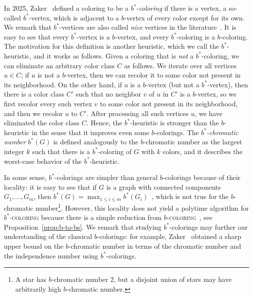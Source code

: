 \documentclass[runningheads, envcountsame]{llncs}
\newcommand{\bscoloring}{$b^*$-\textsc{coloring}\xspace}
\newcommand{\bcoloring}{$b$-\textsc{coloring}\xspace}
\begin{document}
In 2025, Zaker~\cite{ZAKER2025370} defined a coloring to be a $b^*$-\emph{coloring} if there is a vertex, a so-called $b^*$-vertex, which is adjacent to a $b$-vertex of every color except for its own.
We remark that $b^*$-vertices are also called \emph{nice} vertices in the literature~\cite{ZAKER2025370}.
It is easy to see that every $b^*$-vertex is a $b$-vertex, and every $b^*$-coloring is a $b$-coloring.
The motivation for this definition is another heuristic, which we call the $b^*$-heuristic, and it works as follows. Given a coloring that is \emph{not} a $b^*$-coloring, we can eliminate an arbitrary color class $C$ as follows.
We iterate over all vertices $u \in C$; if $u$ is not a $b$-vertex, then we can recolor it to some color not present in its neighborhood.
On the other hand, if $u$ is a $b$-vertex (but not a $b^*$-vertex), then there is a color class $C'$ such that no neighbor $v$ of $u$ in $C'$ is a $b$-vertex, so we first recolor every such vertex $v$ to some color not present in its neighborhood, and then we recolor $u$ to $C'$.
After processing all such vertices $u$, we have eliminated the color class $C$.
Hence, the $b^*$-heuristic is stronger than the $b$-heuristic in the sense that it improves even some $b$-colorings.
The \emph{$b^*$-chromatic number} $b^*(G)$ is defined analogously to the $b$-chromatic number as the largest integer $k$ such that there is a $b^*$-coloring of $G$ with $k$ colors, and it describes the worst-case behavior of the $b^*$-heuristic.

In some sense, $b^*$-colorings are simpler than general $b$-colorings because of their locality: it is easy to see that if $G$ is a graph with connected components $G_1, \ldots, G_m$, then $b^*(G) = \max_{1 \le i \le m} b^*(G_i)$~\cite[Proposition 3]{ZAKER2025370}, which is not true for the $b$-chromatic number\footnote{A star has $b$-chromatic number 2, but a disjoint union of stars may have arbitrarily high $b$-chromatic number.}.
However, this locality does not yield a polytime algorithm for \bscoloring because there is a simple reduction from \bcoloring~\cite{ZAKER2025370}, see Proposition~\ref{prop:b-to-bs}.
We remark that studying $b^*$-colorings may further our understanding of the classical $b$-colorings: for example, Zaker~\cite{zaker2026improved} obtained a sharp upper bound on the $b$-chromatic number in terms of the chromatic number and the independence number using $b^*$-colorings.
\end{document}
